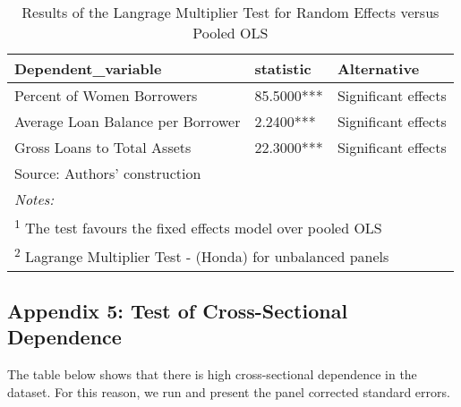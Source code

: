 \documentclass[a4paper,nobind]{templates/ociamthesis}
\begin{document}
\begin{table}

\caption{\label{tab:unnamed-chunk-36}Results of the Langrage Multiplier Test for Random Effects versus Pooled OLS}
\centering
\begin{tabular}[t]{lll}
\toprule
Dependent\_variable & statistic & Alternative\\
\midrule
Percent of Women Borrowers & 85.5000*** & Significant effects\\
Average Loan Balance per Borrower & 2.2400*** & Significant effects\\
Gross Loans to Total Assets & 22.3000*** & Significant effects\\
\bottomrule
\multicolumn{3}{l}{\rule{0pt}{1em}Source: Authors' construction}\\
\multicolumn{3}{l}{\rule{0pt}{1em}\textit{Notes: }}\\
\multicolumn{3}{l}{\rule{0pt}{1em}\textsuperscript{1} The test favours the fixed effects model over pooled OLS}\\
\multicolumn{3}{l}{\rule{0pt}{1em}\textsuperscript{2} Lagrange Multiplier Test - (Honda) for unbalanced panels}\\
\end{tabular}
\end{table}

\newpage

\hypertarget{appendix-5-test-of-cross-sectional-dependence}{%
\subsection{Appendix 5: Test of Cross-Sectional Dependence}\label{appendix-5-test-of-cross-sectional-dependence}}

The table below shows that there is high cross-sectional dependence in the dataset. For this reason, we run and present the panel corrected standard errors.
\end{document}
